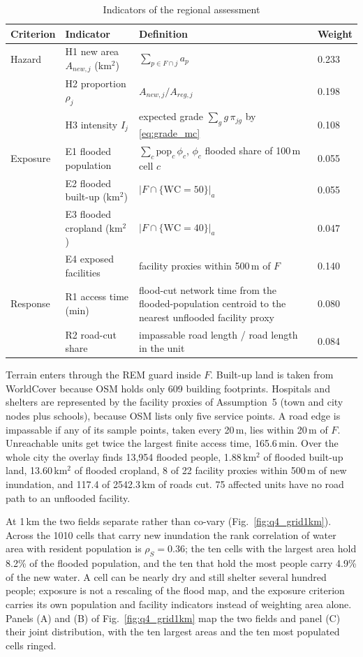 \begin{table}[!ht]
\centering
\caption{Indicators of the regional assessment}
\label{tab:q4_ind}
\small
\begin{tabular}{p{}p{}p{}p{}}
\toprule
Criterion & Indicator & Definition & Weight \\
\midrule
Hazard & H1 new area $A_{new,j}$ (km$^2$) & $\sum_{p\in F\cap j}a_p$ & 0.233 \\
 & H2 proportion $\rho_j$ & $A_{new,j}/A_{reg,j}$ & 0.198 \\
 & H3 intensity $I_j$ & expected grade $\sum_g g\,\pi_{jg}$ by \eqref{eq:grade_mc} & 0.108 \\
Exposure & E1 flooded population & $\sum_c \mathrm{pop}_c\,\phi_c$, $\phi_c$ flooded share of 100\,m cell $c$ & 0.055 \\
 & E2 flooded built-up (km$^2$) & $|F\cap\{\mathrm{WC}=50\}|_a$ & 0.055 \\
 & E3 flooded cropland (km$^2$) & $|F\cap\{\mathrm{WC}=40\}|_a$ & 0.047 \\
 & E4 exposed facilities & facility proxies within 500\,m of $F$ & 0.140 \\
Response & R1 access time (min) & flood-cut network time from the flooded-population centroid to the nearest unflooded facility proxy & 0.080 \\
 & R2 road-cut share & impassable road length / road length in the unit & 0.084 \\
\bottomrule
\end{tabular}
\end{table}

Terrain enters through the REM guard inside $F$. Built-up land is taken from WorldCover because OSM holds only 609 building footprints. Hospitals and shelters are represented by the facility proxies of Assumption~5 (town and city nodes plus schools), because OSM lists only five service points. A road edge is impassable if any of its sample points, taken every 20\,m, lies within 20\,m of $F$. Unreachable units get twice the largest finite access time, 165.6\,min. Over the whole city the overlay finds 13,954 flooded people, 1.88\,km$^2$ of flooded built-up land, 13.60\,km$^2$ of flooded cropland, 8 of 22 facility proxies within 500\,m of new inundation, and 117.4 of 2542.3\,km of roads cut. 75 affected units have no road path to an unflooded facility.

At 1\,km the two fields separate rather than co-vary (Fig.~\ref{fig:q4_grid1km}). Across the 1010 cells that carry new inundation the rank correlation of water area with resident population is $\rho_S=0.36$; the ten cells with the largest area hold 8.2\% of the flooded population, and the ten that hold the most people carry 4.9\% of the new water. A cell can be nearly dry and still shelter several hundred people; exposure is not a rescaling of the flood map, and the exposure criterion carries its own population and facility indicators instead of weighting area alone. Panels (A) and (B) of Fig.~\ref{fig:q4_grid1km} map the two fields and panel (C) their joint distribution, with the ten largest areas and the ten most populated cells ringed.

